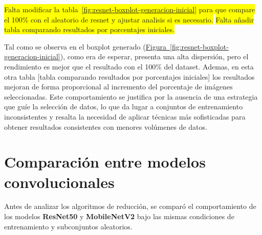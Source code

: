 \colorbox{yellow}{Falta modificar la tabla~\ref{fig:resnet-boxplot-generacion-inicial} para que compare el 100\% con el aleatorio de resnet y ajustar analisis si es necesario.}
\colorbox{yellow}{Falta añadir tabla comparando resultados por porcentajes iniciales.}

Tal como se observa en el boxplot generado (\hyperref[fig:resnet-boxplot-generacion-inicial]{Figura~\ref*{fig:resnet-boxplot-generacion-inicial}}),
como era de esperar, presenta una alta dispersión, pero el rendimiento es mejor que el resultado con el 100\% del dataset.
Ademas, en esta otra tabla [tabla comparando resultados por porcentajes iniciales] los resultados mejoran de forma proporcional al incremento del porcentaje de imágenes seleccionadas.
Este comportamiento se justifica por la ausencia de una estrategia que guíe la selección de datos, lo que da lugar a conjuntos de entrenamiento inconsistentes y
resalta la necesidad de aplicar técnicas más sofisticadas para obtener resultados consistentes con menores volúmenes de datos.


\section{Comparación entre modelos convolucionales}\label{sec:comparacion-modelos-convolucionales}
Antes de analizar los algoritmos de reducción, se comparó el comportamiento de los modelos \textbf{ResNet50} y \textbf{MobileNetV2} bajo las mismas condiciones de entrenamiento y subconjuntos aleatorios.

